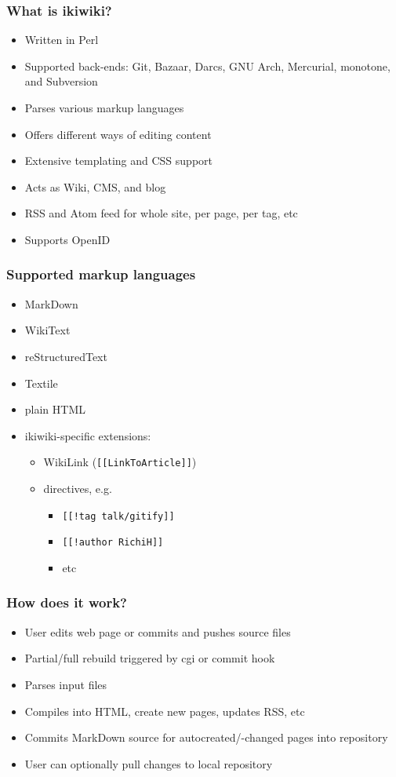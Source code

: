 \documentclass[t]{beamer}
\begin{document}
\begin{frame}
	\frametitle{What is ikiwiki?}
	\begin{itemize}
		\item Written in Perl
		\item Supported back-ends: Git, Bazaar, Darcs, GNU Arch, Mercurial, monotone, and Subversion
		\item Parses various markup languages
		\item Offers different ways of editing content
		\item Extensive templating and CSS support
		\item Acts as Wiki, CMS, and blog
		\item RSS and Atom feed for whole site, per page, per tag, etc
		\item Supports OpenID
	\end{itemize}
\end{frame}

\begin{frame}
	\frametitle{Supported markup languages}
	\begin{itemize}
		\item MarkDown
		\item WikiText
		\item reStructuredText
		\item Textile
		\item plain HTML
		\item ikiwiki-specific extensions:
		\begin{itemize}
			\item WikiLink (\texttt{[[LinkToArticle]]})
			\item directives, e.g.
			\begin{itemize}
				\item \texttt{[[!tag talk/gitify]]}
				\item \texttt{[[!author RichiH]]}
				\item etc
			\end{itemize}
		\end{itemize}
	\end{itemize}
\end{frame}

\begin{frame}
	\frametitle{How does it work?}
	\begin{itemize}
		\item User edits web page or commits and pushes source files
		\item Partial/full rebuild triggered by cgi or commit hook
		\item Parses input files
		\item Compiles into HTML, create new pages, updates RSS, etc
		\item Commits MarkDown source for autocreated/-changed pages into repository
		\item User can optionally pull changes to local repository
	\end{itemize}
\end{frame}
\end{document}
